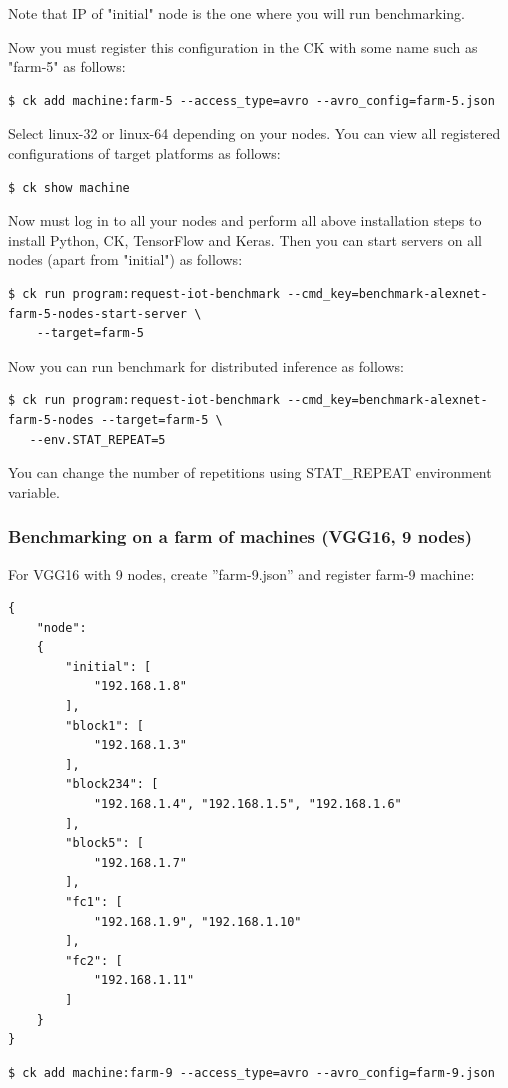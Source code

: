 \documentclass[sigplan]{acmart}
\begin{document}
Note that IP of "initial" node is the one where you will run benchmarking.

Now you must register this configuration in the CK with some name such as "farm-5" as follows:
\begin{verbatim}
$ ck add machine:farm-5 --access_type=avro --avro_config=farm-5.json
\end{verbatim}

Select linux-32 or linux-64 depending on your nodes. 
You can view all registered configurations of target platforms as follows:
\begin{verbatim}
$ ck show machine
\end{verbatim}

Now must log in to all your nodes and perform all above installation steps
to install Python, CK, TensorFlow and Keras. Then you can start servers
on all nodes (apart from "initial") as follows:

\begin{verbatim}
$ ck run program:request-iot-benchmark --cmd_key=benchmark-alexnet-farm-5-nodes-start-server \
    --target=farm-5 
\end{verbatim}
Now you can run benchmark for distributed inference as follows:
\begin{verbatim}
$ ck run program:request-iot-benchmark --cmd_key=benchmark-alexnet-farm-5-nodes --target=farm-5 \
   --env.STAT_REPEAT=5
\end{verbatim}

You can change the number of repetitions using STAT\_REPEAT environment variable.

\subsubsection{Benchmarking on a farm of machines (VGG16, 9 nodes)}

For VGG16 with 9 nodes, create ''farm-9.json'' and register farm-9 machine:
\begin{verbatim}
{
    "node":
    {
        "initial": [
            "192.168.1.8"
        ],
        "block1": [
            "192.168.1.3"
        ],
        "block234": [
            "192.168.1.4", "192.168.1.5", "192.168.1.6"
        ],
        "block5": [
            "192.168.1.7"
        ],
        "fc1": [
            "192.168.1.9", "192.168.1.10"
        ],
        "fc2": [
            "192.168.1.11"
        ]
    }
}
\end{verbatim}

\begin{verbatim}
$ ck add machine:farm-9 --access_type=avro --avro_config=farm-9.json
\end{verbatim}
\end{document}
